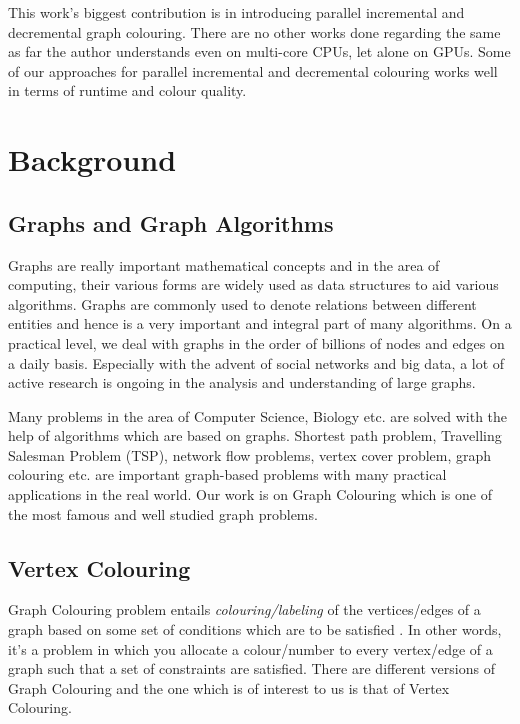 \documentclass[MTech]{iitmdiss}
\begin{document}
This work's biggest contribution is in introducing parallel incremental and decremental graph colouring. There are no other works done regarding the same as far the author understands even on multi-core CPUs, let alone on GPUs. Some of our approaches for parallel incremental and decremental colouring works well in terms of runtime and colour quality.


\chapter{Background}
\section{Graphs and Graph Algorithms}
Graphs are really important mathematical concepts and in the area of computing, their various forms are widely used as data structures to aid various algorithms. Graphs are commonly used to denote relations between different entities and hence is a very important and integral part of many algorithms. On a practical level, we deal with graphs in the order of billions of nodes and edges on a daily basis. Especially with the advent of social networks and big data, a lot of active research is ongoing in the analysis and understanding of large graphs.

Many problems in the area of Computer Science, Biology etc. are solved with the help of algorithms which are based on graphs. Shortest path problem, Travelling Salesman Problem (TSP), network flow problems, vertex cover problem, graph colouring etc. are important graph-based problems with many practical applications in the real world. Our work is on Graph Colouring which is one of the most famous and well studied graph problems.
\section{Vertex Colouring}
Graph Colouring problem entails \textit{colouring/labeling} of the vertices/edges of a graph based on some set of conditions which are to be satisfied \citep{jensen2011graph}. In other words, it's a problem in which you allocate a colour/number to every vertex/edge of a graph such that a set of constraints are satisfied. There are different versions of Graph Colouring and the one which is of interest to us is that of Vertex Colouring.
\end{document}
